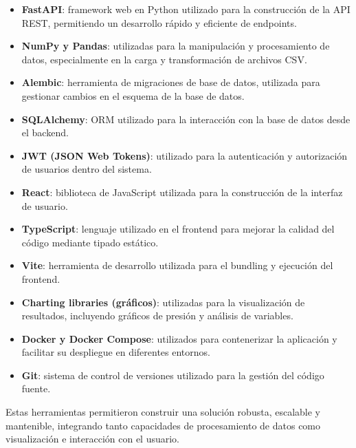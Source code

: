 \documentclass[12pt,a4paper]{article}
\begin{document}
\begin{itemize}
\item \textbf{FastAPI}: framework web en Python utilizado para la construcción de la API REST, permitiendo un desarrollo rápido y 
eficiente de endpoints.

\item \textbf{NumPy y Pandas}: utilizadas para la manipulación y procesamiento de datos, especialmente en la carga y transformación 
de archivos CSV.

\item \textbf{Alembic}: herramienta de migraciones de base de datos, utilizada para gestionar cambios en el esquema de la base de datos.

\item \textbf{SQLAlchemy}: ORM utilizado para la interacción con la base de datos desde el backend.

\item \textbf{JWT (JSON Web Tokens)}: utilizado para la autenticación y autorización de usuarios dentro del sistema.

\item \textbf{React}: biblioteca de JavaScript utilizada para la construcción de la interfaz de usuario.

\item \textbf{TypeScript}: lenguaje utilizado en el frontend para mejorar la calidad del código mediante tipado estático.

\item \textbf{Vite}: herramienta de desarrollo utilizada para el bundling y ejecución del frontend.

\item \textbf{Charting libraries (gráficos)}: utilizadas para la visualización de resultados, incluyendo gráficos de presión y 
análisis de variables.

\item \textbf{Docker y Docker Compose}: utilizados para contenerizar la aplicación y facilitar su despliegue en diferentes entornos.

\item \textbf{Git}: sistema de control de versiones utilizado para la gestión del código fuente.
\end{itemize}

Estas herramientas permitieron construir una solución robusta, escalable y mantenible, integrando tanto capacidades de procesamiento 
de datos como visualización e interacción con el usuario.
\end{document}
